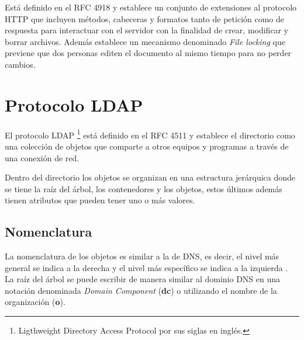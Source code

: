 Est\'{a} definido en el \textsc{RFC} 4918 \cite{_rfc_????-2} y establece un conjunto de extensiones al protocolo \textsc{HTTP} que incluyen m\'{e}todos, cabeceras y formatos tanto de petici\'{o}n como de respuesta para interactuar con el servidor con la finalidad de crear, modificar y borrar archivos. Adem\'{a}s establece un mecanismo denominado \textit{File locking} que previene que dos personas editen el documento al mismo tiempo para no perder cambios.

\section {Protocolo LDAP}

El protocolo \textsc{LDAP} \footnote{Ligthweight Directory Access Protocol por sus siglas en ingl\'{e}s.} est\'{a} definido en el \textsc{RFC} 4511 \cite{_rfc_????-5} y establece el directorio como una colecci\'{o}n de objetos que comparte a otros equipos y programas a trav\'{e}s de una conexi\'{o}n de red.

Dentro del directorio los objetos se organizan en una estructura jer\'{a}rquica donde se tiene la ra\'{i}z del \'{a}rbol, los contenedores y los objetos, estos \'{u}ltimos adem\'{a}s tienen atributos que pueden tener uno o m\'{a}s valores.

  \subsection {Nomenclatura}

La nomenclatura de los objetos es similar a la de \textsc{DNS}, es decir, el nivel m\'{a}s general se indica a la derecha y el nivel m\'{a}s espec\'{i}fico se indica a la izquierda \cite{_appendix_????}. La ra\'{i}z del \'{a}rbol se puede escribir de manera similar al dominio \textsc{DNS} en una notaci\'{o}n denominada \textit{Domain Component} (\textbf{dc}) o utilizando el nombre de la organizaci\'{o}n (\textbf{o}).

\begin{table}[H]
\caption{Nomenclatura del nodo ra\'{i}z de \textsc{LDAP}}{}
\label{tab:nomenclatura-ldap-root}
\noindent{} %
\end{table}

